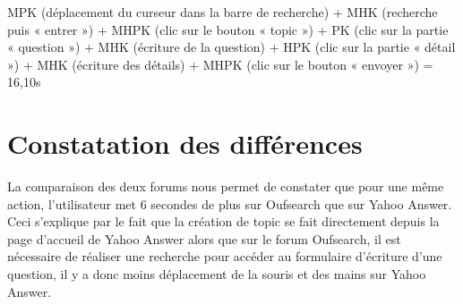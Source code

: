 \documentclass[a4paper,11pt]{report}
\begin{document}
\begin{adjustwidth}{2cm}{}
MPK (déplacement du curseur dans la barre de recherche) \newline+ MHK (recherche puis « entrer ») 
\newline+ MHPK (clic sur le bouton « topic ») \newline+ PK (clic sur la partie « question ») \newline+ MHK (écriture de 
la question) \newline+ HPK (clic sur la partie « détail ») \newline+ MHK (écriture des détails) \newline+ MHPK (clic sur 
le bouton « envoyer ») \newline= 16,10s
\end{adjustwidth}


\section*{Constatation des différences}
La comparaison des deux forums nous permet de constater que pour une même action, 
l’utilisateur met 6 secondes de plus sur Oufsearch que sur Yahoo Answer. Ceci s’explique par le fait que la création de topic se fait directement depuis la page d’accueil de Yahoo Answer alors que sur le forum Oufsearch, il est nécessaire de réaliser une recherche pour accéder au formulaire d’écriture d’une question, il y a donc moins déplacement de la souris et des mains sur Yahoo Answer.
\end{document}
